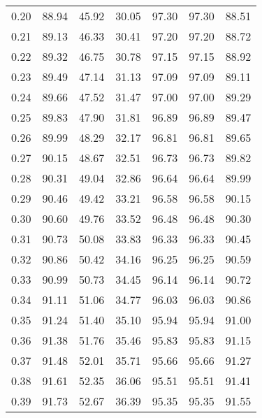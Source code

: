 \begin{tabular}{|c|c|c|c|c|c|c|}
      0.20 &     88.94 &     45.92 &      30.05 &   97.30 &      97.30 &         88.51 \\
      0.21 &     89.13 &     46.33 &      30.41 &   97.20 &      97.20 &         88.72 \\
      0.22 &     89.32 &     46.75 &      30.78 &   97.15 &      97.15 &         88.92 \\
      0.23 &     89.49 &     47.14 &      31.13 &   97.09 &      97.09 &         89.11 \\
      0.24 &     89.66 &     47.52 &      31.47 &   97.00 &      97.00 &         89.29 \\
      0.25 &     89.83 &     47.90 &      31.81 &   96.89 &      96.89 &         89.47 \\
      0.26 &     89.99 &     48.29 &      32.17 &   96.81 &      96.81 &         89.65 \\
      0.27 &     90.15 &     48.67 &      32.51 &   96.73 &      96.73 &         89.82 \\
      0.28 &     90.31 &     49.04 &      32.86 &   96.64 &      96.64 &         89.99 \\
      0.29 &     90.46 &     49.42 &      33.21 &   96.58 &      96.58 &         90.15 \\
      0.30 &     90.60 &     49.76 &      33.52 &   96.48 &      96.48 &         90.30 \\
      0.31 &     90.73 &     50.08 &      33.83 &   96.33 &      96.33 &         90.45 \\
      0.32 &     90.86 &     50.42 &      34.16 &   96.25 &      96.25 &         90.59 \\
      0.33 &     90.99 &     50.73 &      34.45 &   96.14 &      96.14 &         90.72 \\
      0.34 &     91.11 &     51.06 &      34.77 &   96.03 &      96.03 &         90.86 \\
      0.35 &     91.24 &     51.40 &      35.10 &   95.94 &      95.94 &         91.00 \\
      0.36 &     91.38 &     51.76 &      35.46 &   95.83 &      95.83 &         91.15 \\
      0.37 &     91.48 &     52.01 &      35.71 &   95.66 &      95.66 &         91.27 \\
      0.38 &     91.61 &     52.35 &      36.06 &   95.51 &      95.51 &         91.41 \\
      0.39 &     91.73 &     52.67 &      36.39 &   95.35 &      95.35 &         91.55 \\

\end{tabular}
